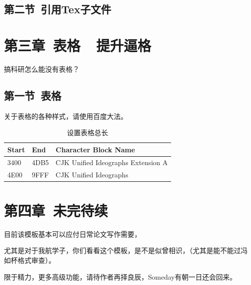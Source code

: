 \documentclass{ctexart}
\begin{document}
\subsection{第二节\ 引用Tex子文件}






\clearpage
\section{第三章\ 表格\ \ 提升逼格}

搞科研怎么能没有表格？\\

\subsection{第一节\ 表格}

关于表格的各种样式，请使用百度大法。\\
\begin{table}[H]
\caption{设置表格总长} 
\begin{tabular*}{12cm}{lll}
\hline  
Start & End  & Character Block Name \\  
\hline  
3400  & 4DB5 & CJK Unified Ideographs Extension A \\  
4E00  & 9FFF & CJK Unified Ideographs \\  
\hline  
\end{tabular*} 
\end{table} 

\section{第四章\ 未完待续}

目前该模板基本可以应付日常论文写作需要，\par
尤其是对于我航学子，你们看看这个模板，是不是似曾相识，（尤其是能不能过冯如杯格式审查）。\par
限于精力，更多高级功能，请待作者再择良辰，Someday有朝一日还会回来。
\end{document}
